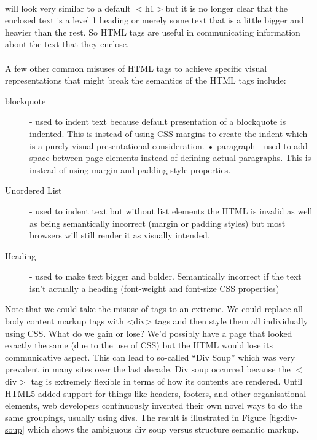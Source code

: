 \paragraph{} will look very similar to a default $<$h1$> $but it is no longer clear that the enclosed text is a level 1 heading or merely some text that is a little bigger and heavier than the rest. So HTML tags are useful in communicating information about the text that they enclose.

\paragraph{} A few other common misuses of HTML tags to achieve specific visual representations that might break the semantics of the HTML tags include:
\begin{description}
\item [blockquote] - used to indent text because default presentation of a blockquote is indented. This is instead of using CSS margins to create the indent which is a purely visual presentational consideration. • paragraph - used to add space between page elements instead of defining actual paragraphs. This is instead of using margin and padding style properties.
\item [Unordered List] - used to indent text but without list elements the HTML is invalid as well as being semantically incorrect (margin or padding styles) but most browsers will still render it as visually intended.
\item [Heading] - used to make text bigger and bolder. Semantically incorrect if the text isn’t actually a heading (font-weight and font-size CSS properties) 
\end{description}
Note that we could take the misuse of tags to an extreme. We could replace all body content markup tags with <div> tags and then style them all individually using CSS. What do we gain or lose? We'd possibly have a page that looked exactly the same (due to the use of CSS) but the HTML would lose its communicative aspect. This can lead to so-called ``Div Soup'' which was very prevalent in many sites over the last decade. Div soup occurred because the $<$div$>$ tag is extremely flexible in terms of how its contents are rendered. Until HTML5 added support for things like headers, footers, and other organisational elements, web developers continuously invented their own novel ways to do the same groupings, usually using divs. The result is illustrated in Figure \ref{fig:div-soup} which shows the ambiguous div soup versus structure semantic markup.

